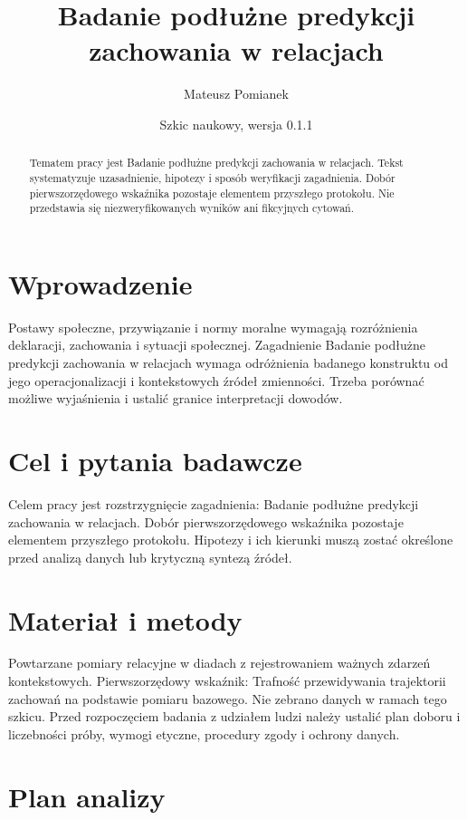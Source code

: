 \documentclass[11pt,a4paper]{article}
\title{Badanie podłużne predykcji zachowania w relacjach}
\author{Mateusz Pomianek}
\date{Szkic naukowy, wersja 0.1.1}
\begin{document}
\maketitle

\begin{abstract}

Tematem pracy jest Badanie podłużne predykcji zachowania w relacjach. Tekst systematyzuje uzasadnienie, hipotezy i sposób weryfikacji zagadnienia. Dobór pierwszorzędowego wskaźnika pozostaje elementem przyszłego protokołu. Nie przedstawia się niezweryfikowanych wyników ani fikcyjnych cytowań.

\end{abstract}

\section{Wprowadzenie}

Postawy społeczne, przywiązanie i normy moralne wymagają rozróżnienia deklaracji, zachowania i sytuacji społecznej. Zagadnienie Badanie podłużne predykcji zachowania w relacjach wymaga odróżnienia badanego konstruktu od jego operacjonalizacji i kontekstowych źródeł zmienności. Trzeba porównać możliwe wyjaśnienia i ustalić granice interpretacji dowodów.

\section{Cel i pytania badawcze}

Celem pracy jest rozstrzygnięcie zagadnienia: Badanie podłużne predykcji zachowania w relacjach. Dobór pierwszorzędowego wskaźnika pozostaje elementem przyszłego protokołu. Hipotezy i ich kierunki muszą zostać określone przed analizą danych lub krytyczną syntezą źródeł.

\section{Materiał i metody}

Powtarzane pomiary relacyjne w diadach z rejestrowaniem ważnych zdarzeń kontekstowych. Pierwszorzędowy wskaźnik: Trafność przewidywania trajektorii zachowań na podstawie pomiaru bazowego. Nie zebrano danych w ramach tego szkicu. Przed rozpoczęciem badania z udziałem ludzi należy ustalić plan doboru i liczebności próby, wymogi etyczne, procedury zgody i ochrony danych.

\section{Plan analizy}
\end{document}
